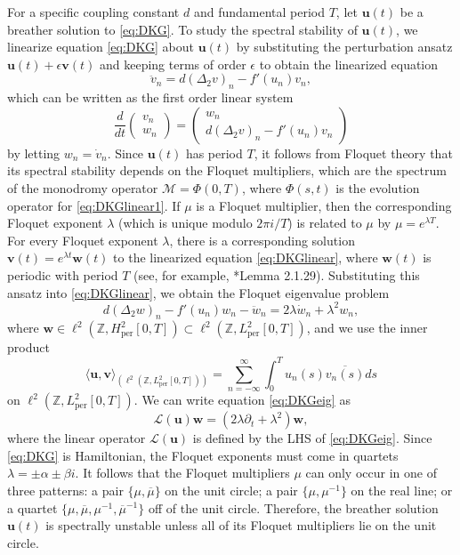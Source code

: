 \documentclass[12pt,reqno]{amsart}
\def\Z{{\mathbb Z}}
\def\per{\textrm{per}}
\def\calL{\mathcal{L}}
\def\calM{\mathcal{M}}
\newcommand{\uvec}{\mathbf{u}}
\newcommand{\vvec}{\mathbf{v}}
\newcommand{\wvec}{\mathbf{w}}
\theoremstyle{definition}
\begin{document}
For a specific coupling constant $d$ and fundamental period $T$, let $\uvec(t)$ be a breather solution to \cref{eq:DKG}. To study the spectral stability of $\uvec(t)$, we linearize equation \cref{eq:DKG} about $\uvec(t)$ by substituting the perturbation ansatz $\uvec(t) + \epsilon \vvec(t)$ and keeping terms of order $\epsilon$ to obtain the linearized equation
\begin{equation}\label{eq:DKGlinear}
\ddot{v}_n = d (\Delta_2 v)_n - f'(u_n)v_n,
\end{equation}
which can be written as the first order linear system
\begin{equation}\label{eq:DKGlinear1}
\frac{d}{dt} \begin{pmatrix} v_n \\ w_n \end{pmatrix} = 
\begin{pmatrix}
w_n \\ 
d (\Delta_2 v)_n - f'(u_n)v_n
\end{pmatrix}
\end{equation}
by letting $w_n = \dot{v}_n$. Since $\uvec(t)$ has period $T$, it follows from Floquet theory that its spectral stability depends on the Floquet multipliers, which are the spectrum of the monodromy operator $\calM = \Phi(0, T)$, where $\Phi(s, t)$ is the evolution operator for \cref{eq:DKGlinear1}. 
If $\mu$ is a Floquet multiplier, then the corresponding Floquet exponent $\lambda$ (which is unique modulo $2 \pi i/T$) is related to $\mu$ by $\mu = e^{\lambda T}$. 
For every Floquet exponent $\lambda$, there is a corresponding solution $\vvec(t) = e^{\lambda t} \wvec(t)$ to the linearized equation \cref{eq:DKGlinear}, where $\wvec(t)$ is periodic with period $T$ (see, for example, \cite{Kapitula2013}*{Lemma 2.1.29}). Substituting this ansatz into \cref{eq:DKGlinear}, we obtain the Floquet eigenvalue problem
\begin{equation}\label{eq:DKGeig}
d (\Delta_2 w)_n - f'(u_n)w_n - \ddot{w}_n = 2 \lambda \dot{w}_n + \lambda^2 w_n,
\end{equation}
where $\wvec \in \ell^2(\Z, H^2_\per[0,T]) \subset \ell^2(\Z, L^2_\per[0,T])$, and we use the inner product
\begin{equation}\label{eq:IP1}
\langle \uvec, \vvec \rangle_{(\ell^2(\Z, L^2_\per[0,T]))} = \sum_{n=-\infty}^\infty \int_0^T u_n(s) \overline{v_n(s)} ds
\end{equation}
on $\ell^2(\Z, L^2_\per[0,T])$. We can write equation \cref{eq:DKGeig} as 
\begin{equation}\label{eq:DKGeigL}
\calL(\uvec)\wvec = (2 \lambda \partial_t + \lambda^2 )\wvec,
\end{equation}
where the linear operator $\calL(\uvec)$ is defined by the LHS of \cref{eq:DKGeig}. Since \cref{eq:DKG} is Hamiltonian, the Floquet exponents must come in quartets $\lambda = \pm \alpha \pm \beta i$. It follows that the Floquet multipliers $\mu$ can only occur in one of three patterns: a pair $\{ \mu, \overline{\mu} \}$ on the unit circle; a pair $\{ \mu, \mu^{-1} \}$ on the real line; or a quartet $\{ \mu, \overline{\mu}, \mu^{-1}, \overline{\mu}^{-1} \}$ off of the unit circle. Therefore, the breather solution $\uvec(t)$ is spectrally unstable unless all of its Floquet multipliers lie on the unit circle.
\end{document}
